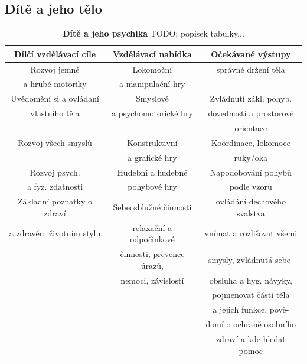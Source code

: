 			\subsection{Dítě a jeho tělo}
				\textit{} \citep[s.~16]{RVP}

\begin{table}[h]
	\small
	\begin{tabular}{|c|c|c|}
	\hline
	\rowcolor{grey}
	\textbf{Dílčí vzdělávací cíle}	& \textbf{Vzdělávací nabídka}	& \textbf{Očekávané výstupy}		\\
	\hline
	\hline
	Rozvoj jemné			& Lokomoční 			& správné držení těla	\\
	a hrubé motoriky 		& a manipulační hry 	& 						\\
	\hline
	Uvědomění si a ovládaní & Smyslové 				& Zvládnutí zákl. pohyb.  				\\
	vlastního těla 			& a psychomotorické hry & dovedností a prostorové 	\\
							&						& orientace 				\\
	\hline
	Rozvoj všech smyslů		& Konstruktivní 		& Koordinace, lokomoce 	\\
							& a grafické hry 		& ruky/oka				\\
	\hline
	Rozvoj psych.  			& Hudební a hudebně 	& Napodobování pohybů 	\\
	a fyz. zdatnosti 		& pohybové hry			& podle vzoru			\\
	\hline
	Základní poznatky o zdraví 		& Sebeosblužné činnosti				& ovládání dechového svalstva 				\\
	a zdravém životním stylu		& relaxační a odpočinkové			& vnímat a rozlišovat všemi  			\\
									& činnosti, prevence úrazů, 		& smysly, zvládnutá sebe-  		\\
									& nemoci, závislostí				& obsluha a hyg. návyky,  		\\
									&									& pojmenovat části těla			\\
									& 									& a jejich funkce, pově-  		\\
									&									& domí o ochraně osobního 		\\
									&									& zdraví a kde hledat pomoc 					\\
	\hline
	\end{tabular}
	\caption{ \textbf{Dítě a jeho psychika}
		TODO: popisek tabulky...
	}
\end{table}

